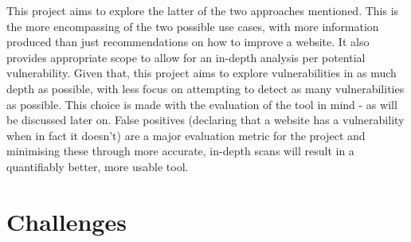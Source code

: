 This project aims to explore the latter of the two approaches mentioned. This is the more encompassing of the two possible use cases, with more information produced than just recommendations on how to improve a website. It also provides appropriate scope to allow for an in-depth analysis per potential vulnerability. Given that, this project aims to explore vulnerabilities in as much depth as possible, with less focus on attempting to detect as many vulnerabilities as possible. This choice is made with the evaluation of the tool in mind - as will be discussed later on. False positives (declaring that a website has a vulnerability when in fact it doesn't) are a major evaluation metric for the project and minimising these through more accurate, in-depth scans will result in a quantifiably better, more usable tool. \\  


\section{Challenges}


